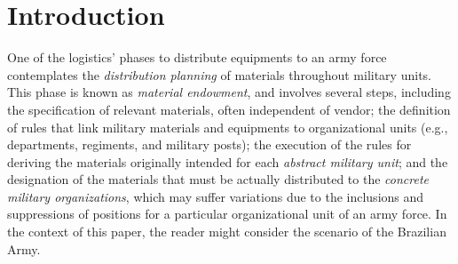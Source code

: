 \section{Introduction}\label{sec:Introduction}


One of the logistics' phases to distribute equipments to an army force contemplates the \emph{distribution planning} of materials throughout military units. This phase is known as \emph{material endowment}, and involves several steps, including the specification of 
relevant materials, often independent of vendor; the definition of rules that link military materials and equipments to organizational units (e.g., departments, regiments, and military posts); the execution of the rules for deriving the materials originally intended for each \emph{abstract military unit}; and the designation of the materials that must be actually distributed to the \emph{concrete military organizations}, which may suffer variations due to the inclusions and suppressions of positions for a particular organizational unit of an army force. In the context of this paper, the reader might consider the scenario of the Brazilian Army. 
 


